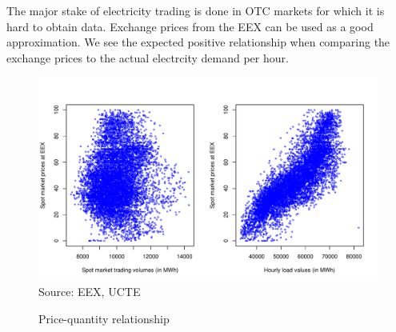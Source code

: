 The major stake of electricity trading is done in OTC markets for which it is hard to obtain data. Exchange prices from the EEX can be used as a good approximation. We see the expected positive relationship when comparing the exchange prices to the actual electrcity demand per hour.

\begin{figure}[htb]
  \centering
\caption{Price-quantity relationship}
  \includegraphics[width=.8\textwidth]{germandata/pricequant.pdf}
  \label{fig:investcosts}
\\
 \scriptsize Source: EEX, UCTE
\end{figure}

\clearpage

